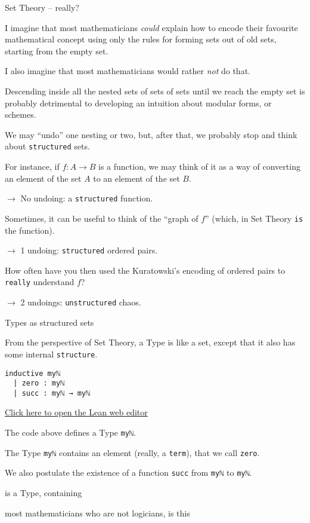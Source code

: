 \documentclass{beamer}
\begin{document}
\begin{frame}[fragile]{Set Theory -- really?}

I imagine that most mathematicians {\emph{could}} explain how to encode their favourite mathematical concept using only the rules for forming sets out of old sets, starting from the empty set.
\bigskip

I also imagine that most mathematicians would rather {\emph{not}} do that.
\bigskip

Descending inside all the nested sets of sets of sets until we reach the empty set is probably detrimental to developing an intuition about modular forms, or schemes.
\end{frame}

\begin{frame}[fragile]

We may ``undo'' one nesting or two, but, after that, we probably stop and think about {\color{purple}\verb`structured`} sets.
\bigskip

For instance, if $f \colon A \longrightarrow B$ is a function, we may think of it as a way of converting an element of the set $A$ to an element of the set $B$.

$\to$ No undoing: a {\color{purple}\verb`structured`} function.
\bigskip

Sometimes, it can be useful to think of the ``graph of $f$'' (which, in Set Theory {\color{purple}\verb`is`} the function).

$\to$ 1 undoing: {\color{purple}\verb`structured`} ordered pairs.
\bigskip

How often have you then used the Kuratowski's encoding of ordered pairs to {\color{purple}\verb`really`} understand $f$?

$\to$ 2 undoings: {\color{purple}\verb`unstructured`} chaos.
\end{frame}

\begin{frame}[fragile]{Types as structured sets}

From the perspective of Set Theory, a Type is like a set, except that it also has some internal {\color{purple}\verb`structure`}.

\begin{verbatim}
inductive myℕ
  | zero : myℕ
  | succ : myℕ → myℕ
\end{verbatim}
\href{https://leanprover-community.github.io/lean-web-editor/#code=inductive%20my%E2%84%95%0A%20%20%7C%20zero%20%3A%20my%E2%84%95%0A%20%20%7C%20succ%20%3A%20my%E2%84%95%20%E2%86%92%20my%E2%84%95%0A%0A%23print%20prefix%20my%E2%84%95%0A}{Click here to open the Lean web editor}
\bigskip

The code above defines a Type {\color{purple}\verb`myℕ`}.
\bigskip

The Type {\color{purple}\verb`myℕ`} contains an element (really, a {\color{purple}\verb`term`}), that we call {\color{purple}\verb`zero`}.
\bigskip

We also postulate the existence of a function {\color{purple}\verb`succ`} from {\color{purple}\verb`myℕ`} to {\color{purple}\verb`myℕ`}.
\end{frame}

\begin{frame}[fragile]

 is a Type, containing

 most mathematicians who are not logicians, is this
\end{frame}
\end{document}
